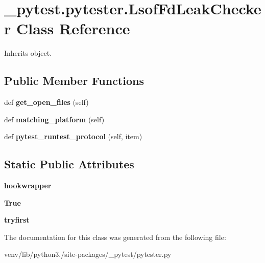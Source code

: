 \hypertarget{class__pytest_1_1pytester_1_1_lsof_fd_leak_checker}{}\section{\+\_\+pytest.\+pytester.\+Lsof\+Fd\+Leak\+Checker Class Reference}
\label{class__pytest_1_1pytester_1_1_lsof_fd_leak_checker}


Inherits object.

\subsection*{Public Member Functions}
\begin{DoxyCompactItemize}
\item 
\mbox{\label{class__pytest_1_1pytester_1_1_lsof_fd_leak_checker_ac9e78ed54901ac0699a3c6ec8c099487}} 
def {\bfseries get\+\_\+open\+\_\+files} (self)
\item 
\mbox{\label{class__pytest_1_1pytester_1_1_lsof_fd_leak_checker_a8cf870968e79fe0f49bc024d8fbe3337}} 
def {\bfseries matching\+\_\+platform} (self)
\item 
\mbox{\label{class__pytest_1_1pytester_1_1_lsof_fd_leak_checker_ab94eb7e09412ad4abf61e607032a5874}} 
def {\bfseries pytest\+\_\+runtest\+\_\+protocol} (self, item)
\end{DoxyCompactItemize}
\subsection*{Static Public Attributes}
\begin{DoxyCompactItemize}
\item 
\mbox{\label{class__pytest_1_1pytester_1_1_lsof_fd_leak_checker_a151358750655339387b830a10ddc5c38}} 
{\bfseries hookwrapper}
\item 
\mbox{\label{class__pytest_1_1pytester_1_1_lsof_fd_leak_checker_a344f7e0fd7d356df51ca05d856af2a90}} 
{\bfseries True}
\item 
\mbox{\label{class__pytest_1_1pytester_1_1_lsof_fd_leak_checker_aca83f4fe6b17272743668d4a8c5614b3}} 
{\bfseries tryfirst}
\end{DoxyCompactItemize}


The documentation for this class was generated from the following file\+:\begin{DoxyCompactItemize}
\item 
venv/lib/python3./site-\/packages/\+\_\+pytest/pytester.\+py\end{DoxyCompactItemize}
